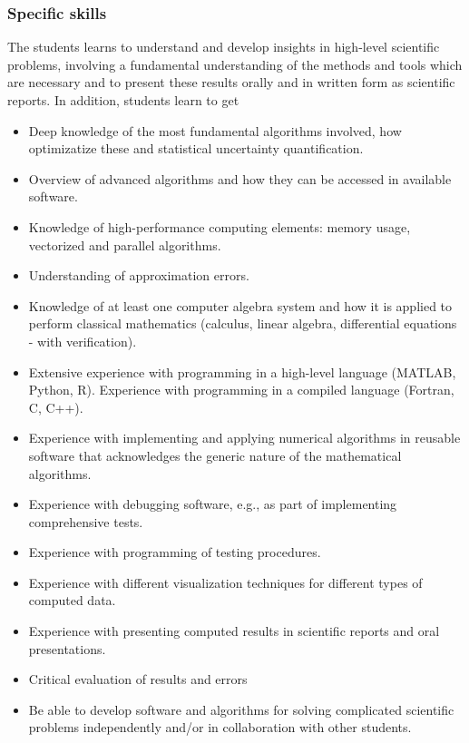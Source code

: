 \documentclass{beamer}
\begin{document}
\begin{frame}
\frametitle{Specific skills}

\begin{block}{}
The students learns to understand and develop insights in high-level scientific problems, involving a fundamental understanding of the methods and tools which are necessary and to present these results orally and in written form as scientific reports. In addition, students learn to get

\begin{itemize}
\item Deep knowledge of the most fundamental algorithms involved, how optimizatize these  and statistical uncertainty quantification.

\item Overview of advanced algorithms and how they can be accessed in available software.

\item Knowledge of high-performance computing elements: memory usage, vectorized and parallel algorithms.

\item Understanding of approximation errors.

\item Knowledge of at least one computer algebra system and how it is applied to perform classical mathematics (calculus, linear algebra, differential equations - with verification).

\item Extensive experience with programming in a high-level language (MATLAB, Python, R). Experience with programming in a compiled language (Fortran, C, C++).

\item Experience with implementing and applying numerical algorithms in reusable software that acknowledges the generic nature of the mathematical algorithms.

\item Experience with debugging software, e.g., as part of implementing comprehensive tests.

\item Experience with programming of testing procedures.

\item Experience with different visualization techniques for different types of computed data.

\item Experience with presenting computed results in scientific reports and oral presentations.

\item Critical evaluation of results and errors

\item Be able to develop software and algorithms for solving complicated scientific problems independently and/or in collaboration with other students.
\end{itemize}

\noindent
\end{block}
\end{frame}
\end{document}
